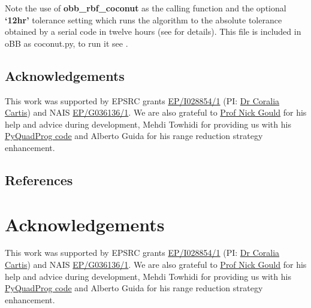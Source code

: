 \documentclass[letterpaper,11pt,openany,oneside]{sphinxmanual}
\begin{document}
Note the use of \textbf{obb\_rbf\_coconut} as the calling function and the optional \textbf{`12hr'} tolerance setting which runs the algorithm to the absolute tolerance obtained by a serial code in twelve hours (see \label{userguide:id11}{\hyperref[userguide:cfg2013]{\crossref{{[}CFG2013{]}}}} for details). This file is included in oBB as coconut.py, to run it see {\hyperref[userguide:running\string-the\string-algorithm]{}}.


\section{Acknowledgements}
\label{userguide:acknowledgements}
This work was supported by EPSRC grants \href{http://gow.epsrc.ac.uk/NGBOViewGrant.aspx?GrantRef=EP/I028854/1}{EP/I028854/1} (PI: \href{http://www.maths.ox.ac.uk/people/profiles/coralia.cartis}{Dr Coralia Cartis}) and NAIS \href{http://gow.epsrc.ac.uk/NGBOViewGrant.aspx?GrantRef=EP/G036136/1}{EP/G036136/1}.
We are also grateful to \href{http://www.numerical.rl.ac.uk/people/nimg/}{Prof Nick Gould} for his help and advice during development, Mehdi Towhidi for providing us with his \href{http://github.com/mpy/PyQuadProg}{PyQuadProg code} and Alberto Guida for his range reduction strategy enhancement.


\section{References}
\label{userguide:references}

\chapter{Acknowledgements}
\label{index:acknowledgements}
This work was supported by EPSRC grants \href{http://gow.epsrc.ac.uk/NGBOViewGrant.aspx?GrantRef=EP/I028854/1}{EP/I028854/1} (PI: \href{http://www.maths.ox.ac.uk/people/profiles/coralia.cartis}{Dr Coralia Cartis}) and NAIS \href{http://gow.epsrc.ac.uk/NGBOViewGrant.aspx?GrantRef=EP/G036136/1}{EP/G036136/1}.
We are also grateful to \href{http://www.numerical.rl.ac.uk/people/nimg/}{Prof Nick Gould} for his help and advice during development, Mehdi Towhidi for providing us with his \href{http://github.com/mpy/PyQuadProg}{PyQuadProg code} and Alberto Guida for his range reduction strategy enhancement.
\end{document}
